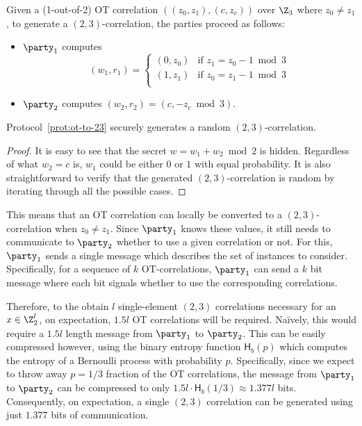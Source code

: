 \begin{protocol}
Given a (1-out-of-2) OT correlation $((z_0,z_1), (c, z_c))$ over $\Z_3$ where $z_0 \neq z_1$, to generate a $(2,3)$-correlation, the parties proceed as follows:

\begin{itemize}
  \item $\party_1$ computes
  \[ (w_1, r_1) = 
  \begin{cases} 
      (0, z_0) & \text{if } z_1=z_0-1 \bmod 3 \\
      (1, z_1) & \text{if } z_0=z_1-1 \bmod 3 \\
   \end{cases}
  \]
  \item $\party_2$ computes $(w_2, r_2) = (c, -z_c \bmod 3)$.
\end{itemize}
\label{prot:ot-to-23}
\end{protocol}

\iffull
\begin{lemma}
  Protocol~\ref{prot:ot-to-23} securely generates a random $(2,3)$-correlation.
\end{lemma}
\begin{proof}
It is easy to see that the secret $w = w_1 + w_2 \bmod 2$ is hidden. Regardless of what $w_2 = c$ is, $w_1$ could be either $0$ or $1$ with equal probability. It is also straightforward to verify that the generated $(2,3)$-correlation is random by iterating through all the possible cases.
\end{proof}
\fi

This means that an OT correlation can locally be converted to a $(2,3)$-correlation when $z_0 \neq z_1$. Since $\party_1$ knows these values, it still needs to communicate to $\party_2$ whether to use a given correlation or not. 
\iffull
For this, $\party_1$ sends a single message which describes the set of instances to consider. Specifically, for a sequence of $k$ OT-correlations, $\party_1$ can send a $k$ bit message where each bit signals whether to use the corresponding correlations. 

Therefore, to the obtain $l$ single-element $(2,3)$ correlations necessary for an $x \in \Z_2^l$, on expectation, $1.5l$ OT correlations will be required. Na{\"i}vely, this would require a $1.5l$ length message from $\party_1$ to $\party_2$. This can be easily compressed however, using the binary entropy function $\textsf{H}_b(p)$ which computes the entropy of a Bernoulli process with probability $p$. Specifically, since we expect to throw away $p = 1/3$ fraction of the OT correlations, the message from $\party_1$ to $\party_2$ can be compressed to only $1.5l \cdot \textsf{H}_b(1/3) \approx 1.377l$ bits. Consequently, on expectation, a single $(2,3)$ correlation can be generated using just $1.377$ bits of communication.


